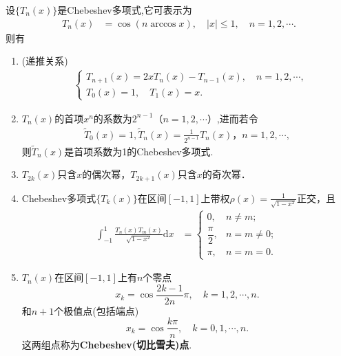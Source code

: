 \documentclass[../../main.tex]{subfiles}
\begin{document}
\begin{theorem}[Chebeshev多项式的性质]\label{theorem:Chebeshev多项式的性质}
设$\{T_n(x)\}$是Chebeshev多项式,它可表示为
\begin{align*}
T_n(x) &= \cos(n \arccos x),\quad |x| \leq 1,\quad n=1,2,\cdots.
\end{align*}
则有
\begin{enumerate}
\item (递推关系)
\begin{align}\label{eq:数值分析-3-2.11}
&\begin{cases}
T_{n+1}(x) = 2xT_n(x) - T_{n-1}(x),\quad n = 1,2,\cdots, \\
T_0(x) = 1,\quad T_1(x) = x.
\end{cases}
\end{align}

\item $T_n(x)$的首项$x^n$的系数为$2^{n-1}$（$n=1,2,\cdots$）,进而若令
\begin{align*}
\widetilde{T}_0(x) = 1,\widetilde{T}_n(x) = \frac{1}{2^{n-1}}T_n(x)，n=1,2,\cdots,
\end{align*}
则$\widetilde{T}_n(x)$是首项系数为1的Chebeshev多项式.

\item $T_{2k}(x)$只含$x$的偶次幂，$T_{2k+1}(x)$只含$x$的奇次幂．

\item Chebeshev多项式$\{T_k(x)\}$在区间$[-1,1]$上带权$\rho(x) = \frac{1}{\sqrt{1 - x^2}}$正交，且
\begin{align}\label{eq:数值分析-3-2.12}
\int_{-1}^1 \frac{T_n(x)T_m(x)}{\sqrt{1 - x^2}}\mathrm{d}x &=
\begin{cases}
0, & n \neq m; \\
\dfrac{\pi}{2}, & n = m \neq 0; \\
\pi, & n = m = 0.
\end{cases}
\end{align}

\item $T_n(x)$在区间$[-1,1]$上有$n$个零点
$$x_k = \cos\frac{2k - 1}{2n}\pi,\quad k = 1,2,\cdots,n.$$
和$n+1$个极值点(包括端点)
$$x_k = \cos\frac{k\pi}{n},\quad k = 0,1,\cdots,n.$$
这两组点称为\textbf{Chebeshev(切比雪夫)点}.
\end{enumerate}
\end{theorem}
\end{document}
